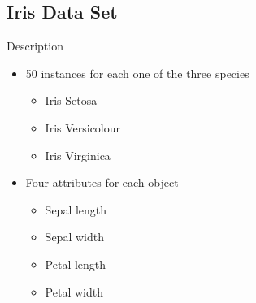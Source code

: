 \documentclass{beamer}
\begin{document}
\subsection{Iris Data Set}

\begin{frame}{Description}
	\begin{itemize}
		\item{50 instances for each one of the three species}
		\begin{itemize}
			\item{Iris Setosa}
			\item{Iris Versicolour}
			\item{Iris Virginica}
		\end{itemize}
		\item{Four attributes for each object}
		\begin{itemize}
			\item{Sepal length}
			\item{Sepal width}
			\item{Petal length}
			\item{Petal width}
		\end{itemize}
	\end{itemize}
\end{frame}
\end{document}
